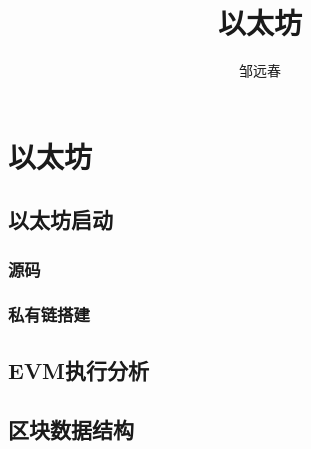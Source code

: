 \documentclass[UTF8]{ctexart}
\title{以太坊}
\author{邹远春}
\date{}
\begin{document}
\maketitle
\newcommand\Emph{\textbf}
\else
\chapter{以太坊}
\fi
\section{以太坊启动}

\subsection{源码}

\subsection{私有链搭建}

\section{EVM执行分析}

\section{区块数据结构}
\end{document}
